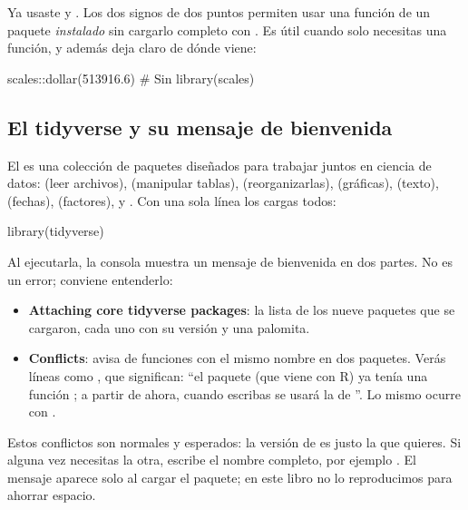 Ya usaste  y . Los dos
signos de dos puntos permiten usar una función de un paquete
\emph{instalado} sin cargarlo completo con . Es útil
cuando solo necesitas una función, y además deja claro de dónde viene:

\begin{rcode}
scales::dollar(513916.6)      # Sin library(scales)
\end{rcode}

\subsection{El tidyverse y su mensaje de bienvenida}

El  es una colección de paquetes diseñados para
trabajar juntos en ciencia de datos:  (leer archivos),
 (manipular tablas),  (reorganizarlas),
 (gráficas),  (texto),
 (fechas),  (factores),
 y . Con una sola línea los cargas todos:

\begin{rcode}
library(tidyverse)
\end{rcode}

Al ejecutarla, la consola muestra un mensaje de bienvenida en dos partes.
No es un error; conviene entenderlo:

\begin{itemize}
  \item \textbf{Attaching core tidyverse packages}: la lista de los nueve
        paquetes que se cargaron, cada uno con su versión y una palomita.
  \item \textbf{Conflicts}: avisa de funciones con el mismo nombre en dos
        paquetes. Verás líneas como , que significan: ``el paquete  (que
        viene con R) ya tenía una función ; a partir de
        ahora, cuando escribas  se usará la de
        ''. Lo mismo ocurre con .
\end{itemize}

Estos conflictos son normales y esperados: la versión de  es
justo la que quieres. Si alguna vez necesitas la otra, escribe el nombre
completo, por ejemplo . El mensaje aparece solo al
cargar el paquete; en este libro no lo reproducimos para ahorrar espacio.

